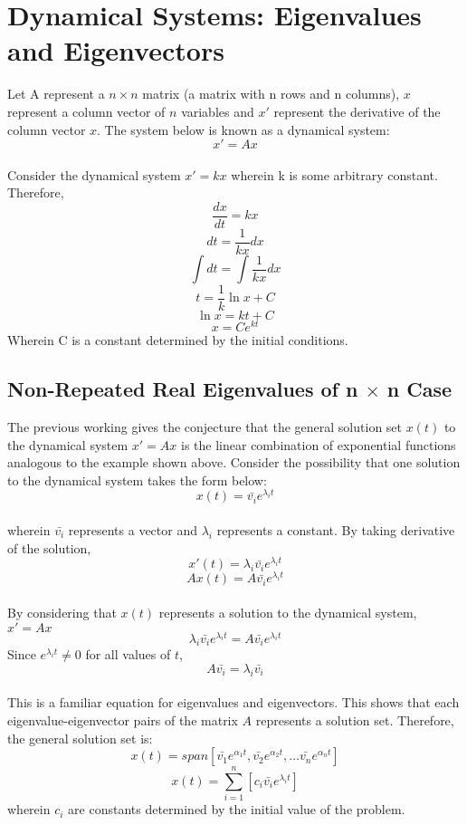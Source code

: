 \chapter{Dynamical Systems: Eigenvalues and Eigenvectors}
\begin{comment}
\end{comment}
Let A represent a $n \times n$ matrix (a matrix with n rows and n columns), $x$ represent a column vector of $n$ variables and $x'$ represent the derivative of the column vector $x$. The system below is known as a dynamical system:
$$x' = Ax$$
\\Consider the dynamical system $x' = kx$ wherein k is some arbitrary constant. Therefore,
$$\frac{dx}{dt} = kx$$
$$dt = \frac{1}{kx}dx$$
$$\int dt = \int \frac{1}{kx}dx$$
$$t = \frac{1}{k}\ln{x}+ C$$
$$\ln{x} = kt + C$$
$$x = Ce^{kt}$$
Wherein C is a constant determined by the initial conditions.
\section{Non-Repeated Real Eigenvalues of n $\times$ n Case}
\begin{comment}
\end{comment}
The previous working gives the conjecture that the general solution set $x(t)$ to the dynamical system $x' = Ax$ is the linear combination of exponential functions analogous to the example shown above. Consider the possibility that one solution to the dynamical system takes the form below:
$$x(t) = \bar{v_i}e^{\lambda_i t}$$
\\wherein $\bar{v_i}$ represents a vector and $\lambda_i$ represents a constant. By taking derivative of the solution, 
$$x'(t) = \lambda_i\bar{v_i}e^{\lambda_i t}$$
$$Ax(t) = A\bar{v_i}e^{\lambda_i t}$$
\\By considering that $x(t)$ represents a solution to the dynamical system, $\displaystyle{x' = Ax}$
$$\lambda_i\bar{v_i}e^{\lambda_i t} = A\bar{v_i}e^{\lambda_i t}$$
Since $e^{\lambda_i t} \neq 0$ for all values of $t$,
$$A\bar{v_i} = \lambda_i\bar{v_i}$$
\\This is a familiar equation for eigenvalues and eigenvectors. This shows that each eigenvalue-eigenvector pairs of the matrix $A$ represents a solution set. Therefore, the general solution set is:
$$x(t) = span[\bar{v_1}e^{\alpha_1 t}, \bar{v_2}e^{\alpha_2 t}, \dots \bar{v_n}e^{\alpha_n t}]$$
$$x(t) = \sum_{i = 1}^{n} \left[c_i\bar{v_i}e^{\lambda_i t}\right]$$
wherein $c_i$ are constants determined by the initial value of the problem. 
